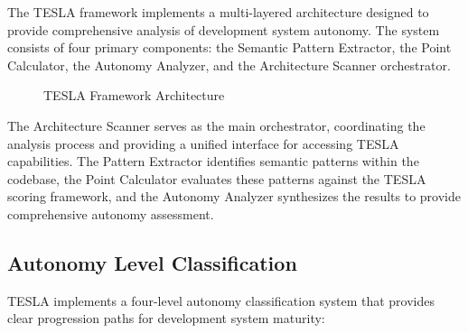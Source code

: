 \documentclass[10pt]{article}
\begin{document}
The TESLA framework implements a multi-layered architecture designed to provide comprehensive analysis of development system autonomy. The system consists of four primary components: the Semantic Pattern Extractor, the Point Calculator, the Autonomy Analyzer, and the Architecture Scanner orchestrator.

\begin{figure}[H]
\centering
{}
\caption{TESLA Framework Architecture}
\label{fig:tesla-architecture}
\end{figure}

The Architecture Scanner serves as the main orchestrator, coordinating the analysis process and providing a unified interface for accessing TESLA capabilities. The Pattern Extractor identifies semantic patterns within the codebase, the Point Calculator evaluates these patterns against the TESLA scoring framework, and the Autonomy Analyzer synthesizes the results to provide comprehensive autonomy assessment.

\subsection{Autonomy Level Classification}

TESLA implements a four-level autonomy classification system that provides clear progression paths for development system maturity:
\end{document}
